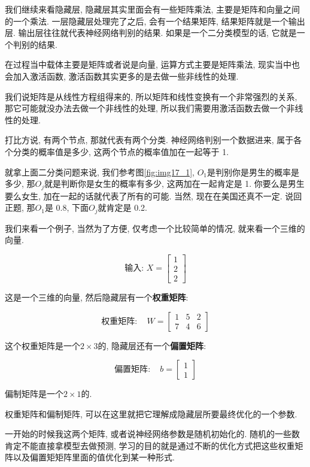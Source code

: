 我们继续来看隐藏层, 隐藏层其实里面会有一些矩阵乘法, 主要是矩阵和向量之间的一个乘法. 一层隐藏层处理完了之后, 会有一个结果矩阵, 结果矩阵就是一个输出层. 输出层往往就代表神经网络判别的结果. 如果是一个二分类模型的话, 它就是一个判别的结果. 

在过程当中载体主要是矩阵或者说是向量, 运算方式主要是矩阵乘法, 现实当中也会加入激活函数, 激活函数其实更多的是去做一些非线性的处理. 

我们说矩阵是从线性方程组得来的, 所以矩阵和线性变换有一个非常强烈的关系, 那它可能就没办法去做一个非线性的处理, 所以我们需要用激活函数去做一个非线性的处理. 

打比方说, 有两个节点, 那就代表有两个分类. 神经网络判别一个数据进来, 属于各个分类的概率值是多少, 这两个节点的概率值加在一起等于 1. 

就拿上面二分类问题来说, 我们参考图\ref{fig:img17_1}, $O_1$是判别你是男生的概率是多少, 那$O_j$就是判断你是女生的概率有多少, 这两加在一起肯定是 1. 你要么是男生要么女生, 加在一起的话就代表了所有的可能. 当然, 现在在美国还真不一定. 说回正题, 那$O_1$是 0.8, 下面$O_j$就肯定是 0.2. 

我们来看一个例子, 当然为了方便, 仅考虑一个比较简单的情况, 就来看一个三维的向量. 

\[
  \mbox{输入: } X = \begin{bmatrix} 1 \\ 2 \\ 2 \end{bmatrix}
\]

这是一个三维的向量, 然后隐藏层有一个\textbf{权重矩阵}: 

\[
  \mbox{权重矩阵}: \quad W = \begin{bmatrix} 1 & 5 & 2 \\ 7 & 4 & 6 \end{bmatrix}
\]

这个权重矩阵是一个$2 \times 3$的, 隐藏层还有一个\textbf{偏置矩阵}: 

\[
  \mbox{偏置矩阵}: \quad b = \begin{bmatrix} 1 \\ 1 \end{bmatrix}
\]

偏制矩阵是一个$2 \times 1$的. 

权重矩阵和偏制矩阵, 可以在这里就把它理解成隐藏层所要最终优化的一个参数. 

一开始的时候我这两个矩阵, 或者说神经网络参数是随机初始化的. 随机的一些数肯定不能直接拿模型去做预测, 学习的目的就是通过不断的优化方式把这些权重矩阵以及偏置矩矩阵里面的值优化到某一种形式. 

